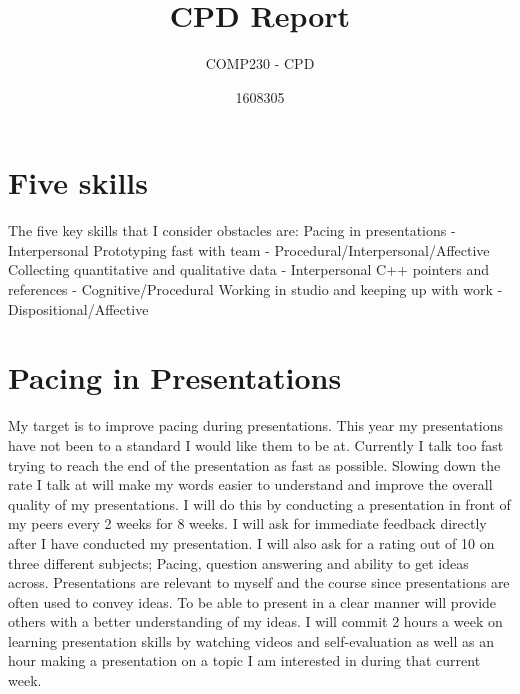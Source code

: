 \documentclass{scrartcl}
\title{CPD Report}
\subtitle{COMP230 - CPD}
\author{1608305}
\begin{document}
\maketitle

\section{Five skills}

The five key skills that I consider obstacles are:
\newline
Pacing in presentations - Interpersonal
\newline
Prototyping fast with team - Procedural/Interpersonal/Affective
\newline
Collecting quantitative and qualitative data - Interpersonal
\newline
C++ pointers and references - Cognitive/Procedural
\newline
Working in studio and keeping up with work - Dispositional/Affective

\section{Pacing in Presentations}
My target is to improve pacing during presentations. This year my presentations have not been to a standard I would like them to be at. Currently I talk too fast trying to reach the end of the presentation as fast as possible. Slowing down the rate I talk at will make my words easier to understand and improve the overall quality of my presentations.  
\newline
\newline
I will do this by conducting a presentation in front of my peers every 2 weeks for 8 weeks. I will ask for immediate feedback directly after I have conducted my presentation. I will also ask for a rating out of 10 on three different subjects; Pacing, question answering and ability to get ideas across. 
\newline
\newline
Presentations are relevant to myself and the course since presentations are often used to convey ideas. To be able to present in a clear manner will provide others with a better understanding of my ideas.
\newline
\newline
I will commit 2 hours a week on learning presentation skills by watching videos and self-evaluation as well as an hour making a presentation on a topic I am interested in during that current week.
\end{document}
